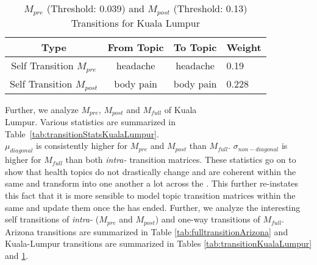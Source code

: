 \begin{table}[b!]
\centering
\caption{$M_{pre}$ (Threshold: 0.039) and $M_{post}$ (Threshold: 0.13) Transitions for Kuala Lumpur}
\label{tab:transitionKualaLumpurprepost}
\begin{tabular}{|c|c|c|l|} \hline
Type &From Topic&To Topic&Weight\\ \hline
Self Transition $M_{pre}$ & headache & headache& 0.19 \\ \hline
Self Transition $M_{post}$& body pain& body pain& 0.228\\ 
\hline\end{tabular}
\end{table}
Further, we analyze $M_{pre}$, $M_{post}$ and $M_{full}$ of Kuala\\
 Lumpur. Various statistics are summarized in Table~\ref{tab:transitionStatsKualaLumpur}.\\
 $\mu_{diagonal}$ is consistently higher for $M_{pre}$ and $M_{post}$ than $M_{full}$. $\sigma_{non-diagonal}$ is higher for
 $M_{full}$ than both \textit{intra-\change} transition matrices. These statistics go on to 
show that health topics do not drastically change and are coherent within 
the same \change and transform into one another a lot across the 
\changes. This further re-instates this fact that it is 
more sensible to model topic transition matrices within the same
\change and update them once the \change has ended. Further, 
we analyze the interesting self transitions of \textit{intra-\change}
($M_{pre}$ and $M_{post}$) and one-way transitions of $M_{full}$.
Arizona transitions are summarized in Table \ref{tab:fulltransitionArizona} and Kuala-Lumpur transitions are summarized in Tables
\ref{tab:transitionKualaLumpur} and \ref{tab:transitionKualaLumpurprepost}.

